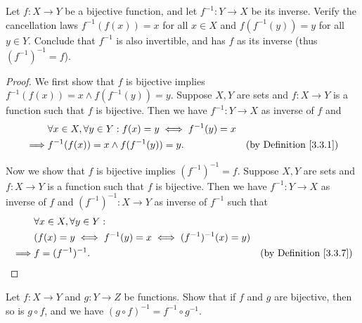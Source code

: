 \begin{exercise}\label{ex 3.3.6}
    Let \(f : X \to Y\) be a bijective function, and let \(f^{-1} : Y \to X\) be its inverse.
    Verify the cancellation laws \(f^{-1}(f(x)) = x\) for all \(x \in X\) and \(f(f^{-1}(y)) = y\) for all \(y \in Y\).
    Conclude that \(f^{-1}\) is also invertible, and has \(f\) as its inverse (thus \((f^{-1})^{-1} = f\)).
\end{exercise}

\begin{proof}
    We first show that \(f\) is bijective implies \(f^{-1}(f(x)) = x \land f(f^{-1}(y)) = y\).
    Suppose \(X, Y\) are sets and \(f : X \to Y\) is a function such that \(f\) is bijective.
    Then we have \(f^{-1} : Y \to X\) as inverse of \(f\) and
    \begin{align*}
                 & \forall x \in X, \forall y \in Y : f(x) = y \iff f^{-1}(y) = x                                      \\
        \implies & f^{-1}(f(x)) = x \land f(f^{-1}(y)) = y.                       & \text{(by Definition \ref{3.3.1})}
    \end{align*}

    Now we show that \(f\) is bijective implies \((f^{-1})^{-1} = f\).
    Suppose \(X, Y\) are sets and \(f : X \to Y\) is a function such that \(f\) is bijective.
    Then we have \(f^{-1} : Y \to X\) as inverse of \(f\) and \((f^{-1})^{-1} : X \to Y\) as inverse of \(f^{-1}\) such that
    \begin{align*}
                 & \forall x \in X, \forall y \in Y :                                                           \\
                 & (f(x) = y \iff f^{-1}(y) = x \iff (f^{-1})^{-1}(x) = y)                                      \\
        \implies & f = (f^{-1})^{-1}.                                      & \text{(by Definition \ref{3.3.7})}
    \end{align*}
\end{proof}

\begin{exercise}\label{ex 3.3.7}
    Let \(f : X \to Y\) and \(g : Y \to Z\) be functions.
    Show that if \(f\) and \(g\) are bijective, then so is \(g \circ f\), and we have \((g \circ f)^{-1} = f^{-1} \circ g^{-1}\).
\end{exercise}

